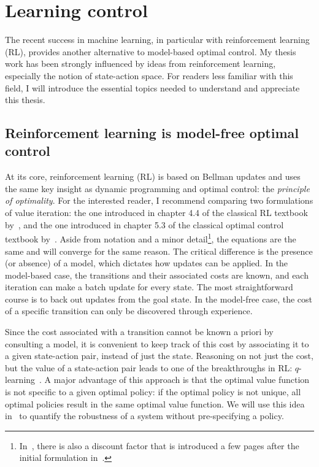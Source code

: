 \section{Learning control}

The recent success in machine learning, in particular with reinforcement learning (RL), provides another alternative to model-based optimal control. My thesis work has been strongly influenced by ideas from reinforcement learning, especially the notion of state-action space. For readers less familiar with this field, I will introduce the essential topics needed to understand and appreciate this thesis.

\subsection{Reinforcement learning is model-free optimal control}
At its core, reinforcement learning (RL) is based on Bellman updates and uses the same key insight as dynamic programming and optimal control: the \emph{principle of optimality}.
For the interested reader, I recommend comparing two formulations of value iteration: the one introduced in chapter 4.4 of the classical RL textbook by~\textcite{sutton2018book}, and the one introduced in chapter 5.3 of the classical optimal control textbook by~\textcite{bertsekas2017book}. Aside from notation and a minor detail\footnote{In~\cite{sutton2018book}, there is also a discount factor that is introduced a few pages after the initial formulation in~\cite{bertsekas2017book}.}, the equations are the same and will converge for the same reason. The critical difference is the presence (or absence) of a model, which dictates how updates can be applied.
In the model-based case, the transitions and their associated costs are known, and each iteration can make a batch update for every state. The most straightforward course is to back out updates from the goal state. In the model-free case, the cost of a specific transition can only be discovered through experience. \par
Since the cost associated with a transition cannot be known a priori by consulting a model, it is convenient to keep track of this cost by associating it to a given state-action pair, instead of just the state. Reasoning on not just the cost, but the value of a state-action pair leads to one of the breakthroughs in RL: $q$-learning~\cite[cf. chapter 6.5]{sutton2018book}. A major advantage of this approach is that the optimal value function is not specific to a given optimal policy: if the optimal policy is not unique, all optimal policies result in the same optimal value function. We will use this idea in~\cite{heim2019beyond} to quantify the robustness of a system without pre-specifying a policy.

